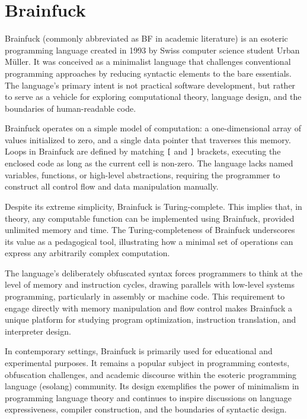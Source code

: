 \chapter{Brainfuck}
\label{chap:ch2}

\par Brainfuck (commonly abbreviated as BF in academic literature) is an esoteric programming language created in 1993 by Swiss computer science student Urban Müller. It was conceived as a minimalist language that challenges conventional programming approaches by reducing syntactic elements to the bare essentials. The language's primary intent is not practical software development, but rather to serve as a vehicle for exploring computational theory, language design, and the boundaries of human-readable code.

\par Brainfuck operates on a simple model of computation: a one-dimensional array of values initialized to zero, and a single data pointer that traverses this memory. Loops in Brainfuck are defined by matching \texttt{[} and \texttt{]} brackets, executing the enclosed code as long as the current cell is non-zero. The language lacks named variables, functions, or high-level abstractions, requiring the programmer to construct all control flow and data manipulation manually.

\par Despite its extreme simplicity, Brainfuck is Turing-complete. This implies that, in theory, any computable function can be implemented using Brainfuck, provided unlimited memory and time. The Turing-completeness of Brainfuck underscores its value as a pedagogical tool, illustrating how a minimal set of operations can express any arbitrarily complex computation.

\par The language's deliberately obfuscated syntax forces programmers to think at the level of memory and instruction cycles, drawing parallels with low-level systems programming, particularly in assembly or machine code. This requirement to engage directly with memory manipulation and flow control makes Brainfuck a unique platform for studying program optimization, instruction translation, and interpreter design.

\par In contemporary settings, Brainfuck is primarily used for educational and experimental purposes. It remains a popular subject in programming contests, obfuscation challenges, and academic discourse within the esoteric programming language (esolang) community. Its design exemplifies the power of minimalism in programming language theory and continues to inspire discussions on language expressiveness, compiler construction, and the boundaries of syntactic design.

